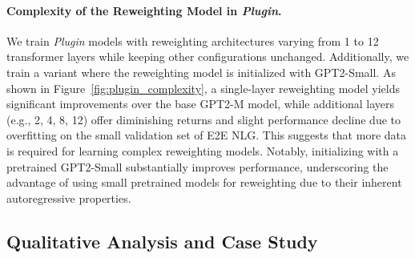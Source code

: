 \paragraph{Complexity of the Reweighting Model in \textit{Plugin}.}  
We train \textit{Plugin} models with reweighting architectures varying from 1 to 12 transformer layers while keeping other configurations unchanged. Additionally, we train a variant where the reweighting model is initialized with GPT2-Small. As shown in Figure~\ref{fig:plugin_complexity}, a single-layer reweighting model yields significant improvements over the base GPT2-M model, while additional layers (e.g., 2, 4, 8, 12) offer diminishing returns and slight performance decline due to overfitting on the small validation set of E2E NLG. This suggests that more data is required for learning complex reweighting models. Notably, initializing with a pretrained GPT2-Small substantially improves performance, underscoring the advantage of using small pretrained models for reweighting due to their inherent autoregressive properties.







\subsection{Qualitative Analysis and Case Study}
\label{ssec:qualitative}

